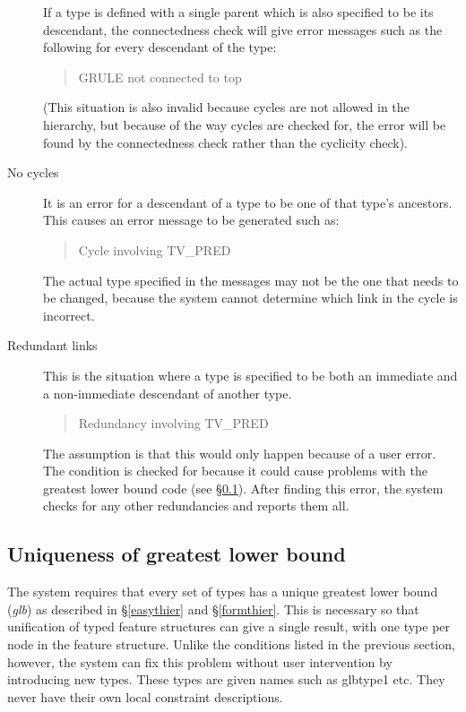 \documentclass[12pt]{report}
\newenvironment{error}%
{\begin{quote}
\tt
}%
{\end{quote}
}
\newcommand{\newterm}[1]{{\it #1}}
\begin{document}
\begin{description}
If a type is defined with a single parent which is also specified to be its 
descendant, the connectedness check will give error messages such as the
following for every descendant of the type:
\begin{error}
GRULE not connected to top
\end{error}
(This situation is also invalid because cycles are not allowed in the
hierarchy, but because of the way cycles are checked for, the error will be
found by the connectedness check rather than the cyclicity check).
\item[No cycles]
It is an error for a descendant of a type to be one of that type's ancestors.
This causes an error message to be generated such as:
\begin{error}
Cycle involving TV\_PRED
\end{error}
The actual type specified in the
messages may not be the one that needs to be changed,
because the system cannot determine which link in the cycle is incorrect.
\item[Redundant links] This is the situation where a type is
specified to be both an immediate and a non-immediate descendant of another type.
\begin{error}
Redundancy involving TV\_PRED
\end{error}
The assumption is that this would only happen because of a user error.
The condition is checked for because it could cause problems with the
greatest lower bound code (see \S\ref{glbgen}).
After finding this error, the system checks for any other redundancies
and reports them all.
\end{description}

\subsection{Uniqueness of greatest lower bound}
\label{glbgen}
  
The system requires that every set of types has a unique greatest lower bound
(\newterm{glb})
as described in \S\ref{easythier} and \S\ref{formthier}.  
This is necessary so that unification of typed feature structures
can give a single result, with one type per node in the feature structure.
Unlike the conditions listed in the previous section, however, the system can
fix this problem without user intervention by introducing new types.  These
types are given names such as {\type glbtype1} etc.  They never have 
their own local constraint descriptions.
\end{document}
